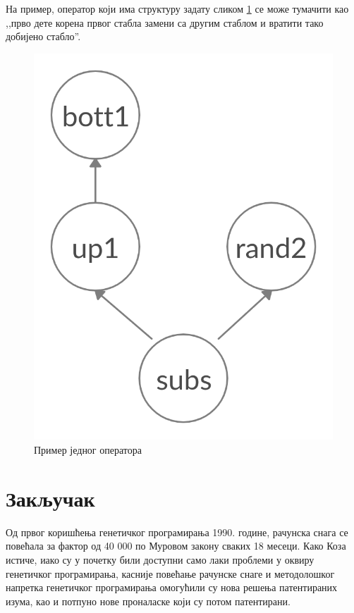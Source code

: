 \documentclass[a4paper]{article}
\begin{document}
На пример, оператор који има структуру задату сликом \ref{fig:mgp_primer} се може тумачити као ,,прво дете корена првог стабла замени са другим стаблом и вратити тако добијено стабло''.

\begin{figure}[ht!]
    \begin{center}
        \includegraphics[scale=0.12]{mgp_primer.png}
    \end{center}
    \caption{Пример једног оператора}
    \label{fig:mgp_primer}
\end{figure}

\section{Закључак}

Од првог коришћења генетичког програмирања 1990. године, рачунска снага се повећала за фактор од 40 000 по Муровом закону сваких 18 месеци. Како Коза истиче, иако су у почетку били доступни само лаки проблеми у оквиру генетичког програмирања, касније повећање рачунске снаге и методолошког напретка генетичког програмирања омогућили су нова решења патентираних изума, као и потпуно нове проналаске који су потом патентирани.
\end{document}
